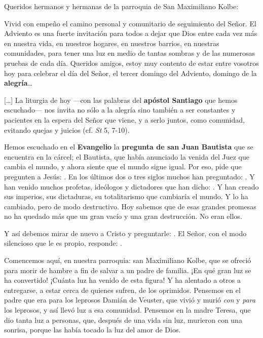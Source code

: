 				\begin{body}
					Queridos hermanos y hermanas de la parroquia de San Maximiliano Kolbe:
					
					Vivid con empeño el camino personal y comunitario de seguimiento del Señor. El Adviento es una fuerte invitación para todos a dejar que Dios entre cada vez más en nuestra vida, en nuestros hogares, en nuestros barrios, en nuestras comunidades, para tener una luz en medio de tantas sombras y de las numerosas pruebas de cada día. Queridos amigos, estoy muy contento de estar entre vosotros hoy para celebrar el día del Señor, el tercer domingo del Adviento, domingo de la \textbf{alegría}\ldots{}
					
					[\ldots{}] La liturgia de hoy ---con las palabras del \textbf{apóstol Santiago} que hemos escuchado--- nos invita no sólo a la alegría sino también a ser constantes y pacientes en la espera del Señor que viene, y a serlo juntos, como comunidad, evitando quejas y juicios (cf. \emph{St} 5, 7-10).
					
					Hemos escuchado en el \textbf{Evangelio} la \textbf{pregunta de san Juan Bautista} que se encuentra en la cárcel; el Bautista, que había anunciado la venida del Juez que cambia el mundo, y ahora siente que el mundo sigue igual. Por eso, pide que pregunten a Jesús: . En los últimos dos o tres siglos muchos han preguntado: . Y han venido muchos profetas, ideólogos y dictadores que han dicho: . Y han creado sus imperios, sus dictaduras, su totalitarismo que cambiaría el mundo. Y lo ha cambiado, pero de modo destructivo. Hoy sabemos que de esas grandes promesas no ha quedado más que un gran vacío y una gran destrucción. No eran ellos.
					
					Y así debemos mirar de nuevo a Cristo y preguntarle: . El Señor, con el modo silencioso que le es propio, responde: .
					
					Comencemos aquí, en nuestra parroquia: san Maximiliano Kolbe, que se ofreció para morir de hambre a fin de salvar a un padre de familia. ¡En qué gran luz se ha convertido! ¡Cuánta luz ha venido de esta figura! Y ha alentado a otros a entregarse, a estar cerca de quienes sufren, de los oprimidos. Pensemos en el padre que era para los leprosos Damián de Veuster, que vivió y murió \emph{con} y \emph{para} los leprosos, y así llevó luz a esa comunidad. Pensemos en la madre Teresa, que dio tanta luz a personas, que, después de una vida sin luz, murieron con una sonrisa, porque las había tocado la luz del amor de Dios.
					

\end{body}
